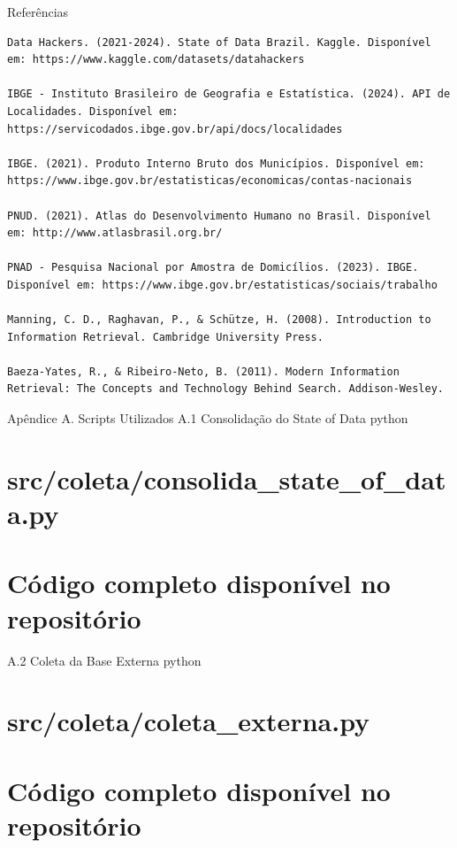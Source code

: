 \documentclass[
  11pt,
  letterpaper,
  DIV=11,
  numbers=noendperiod]{scrartcl}
\begin{document}
Referências

\begin{verbatim}
Data Hackers. (2021-2024). State of Data Brazil. Kaggle. Disponível em: https://www.kaggle.com/datasets/datahackers

IBGE - Instituto Brasileiro de Geografia e Estatística. (2024). API de Localidades. Disponível em: https://servicodados.ibge.gov.br/api/docs/localidades

IBGE. (2021). Produto Interno Bruto dos Municípios. Disponível em: https://www.ibge.gov.br/estatisticas/economicas/contas-nacionais

PNUD. (2021). Atlas do Desenvolvimento Humano no Brasil. Disponível em: http://www.atlasbrasil.org.br/

PNAD - Pesquisa Nacional por Amostra de Domicílios. (2023). IBGE. Disponível em: https://www.ibge.gov.br/estatisticas/sociais/trabalho

Manning, C. D., Raghavan, P., & Schütze, H. (2008). Introduction to Information Retrieval. Cambridge University Press.

Baeza-Yates, R., & Ribeiro-Neto, B. (2011). Modern Information Retrieval: The Concepts and Technology Behind Search. Addison-Wesley.
\end{verbatim}

Apêndice A. Scripts Utilizados A.1 Consolidação do State of Data python

\section{src/coleta/consolida\_state\_of\_data.py}\label{srccoletaconsolida_state_of_data.py}

\section{Código completo disponível no
repositório}\label{cuxf3digo-completo-disponuxedvel-no-reposituxf3rio}

A.2 Coleta da Base Externa python

\section{src/coleta/coleta\_externa.py}\label{srccoletacoleta_externa.py-1}

\section{Código completo disponível no
repositório}\label{cuxf3digo-completo-disponuxedvel-no-reposituxf3rio-1}
\end{document}
